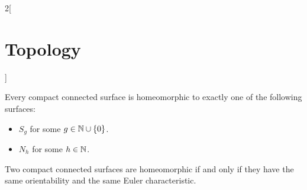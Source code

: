 \documentclass[../../../main.tex]{subfiles}
\begin{document}
\begin{multicols}{2}[\section{Topology}]
\begin{theorem}
    Every compact connected surface is homeomorphic to exactly one of the following surfaces:
    \begin{itemize}
      \item $S_g$ for some $g\in\mathbb{N}\cup\{0\}$.
      \item $N_h$ for some $h\in\mathbb{N}$.
    \end{itemize}
  \end{theorem}
  \begin{corollary}
    Two compact connected surfaces are homeomorphic if and only if they have the same orientability and the same Euler characteristic.
  \end{corollary}
\end{multicols}
\end{document}
